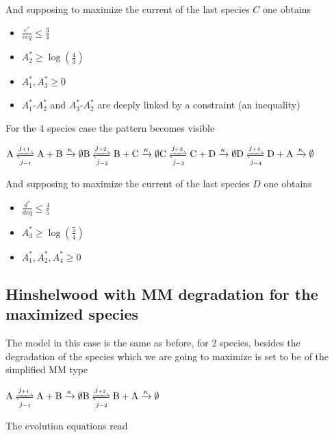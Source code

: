 \documentclass{article}
\begin{document}
	And supposing to maximize the current of the last species $C$ one obtains
	
	\begin{itemize}
		\item $\frac{c^*}{ceq} \le \frac{3}{4}$
		\item $A_2^* \ge \log \left( \frac{4}{3}\right)$
		\item $A_1^*, A_3^* \ge 0$
		
		\item $A_1^*$-$A_2^*$ and $A_3^*$-$A_2^*$ are deeply linked by a constraint (an inequality)
	\end{itemize}
	
	For the 4 species case the pattern becomes visible
	
	\begin{center}
		$\mathrm{A} \xrightleftharpoons[j_{-1}]{j_{+1}}\mathrm{A+B}\xrightarrow{\kappa}\emptyset\\
		\mathrm{B} \xrightleftharpoons[j_{-2}]{j_{+2}}\mathrm{B+C}\xrightarrow{\kappa}\emptyset\\
		\mathrm{C} \xrightleftharpoons[j_{-3}]{j_{+3}}\mathrm{C+D}\xrightarrow{\kappa}\emptyset\\
		\mathrm{D} \xrightleftharpoons[j_{-4}]{j_{+4}}\mathrm{D+A}\xrightarrow{\kappa}\emptyset\\
		$
	\end{center}
	
	And supposing to maximize the current of the last species $D$ one obtains
	
	\begin{itemize}
		\item $\frac{d^*}{deq} \le \frac{4}{5}$
		\item $A_3^* \ge \log \left( \frac{5}{4}\right)$
		\item $A_1^*, A_2^*, A_4^* \ge 0$
		
		
	\end{itemize}
	
	\subsection{Hinshelwood with MM degradation for the maximized species}
	
	The model in this case is the same as before, for 2 species, besides the degradation of the species which we are going to maximize is set to be of the simplified MM type
	
	\begin{center}$\mathrm{A} \xrightleftharpoons[j_{-1}]{j_{+1}}\mathrm{A+B}\xrightarrow{\kappa}\emptyset\\
		\mathrm{B} \xrightleftharpoons[j_{-2}]{j_{+2}}\mathrm{B+A}\xrightarrow{\kappa}\emptyset\\
		$
	\end{center}
	The evolution equations read
	
\end{document}
